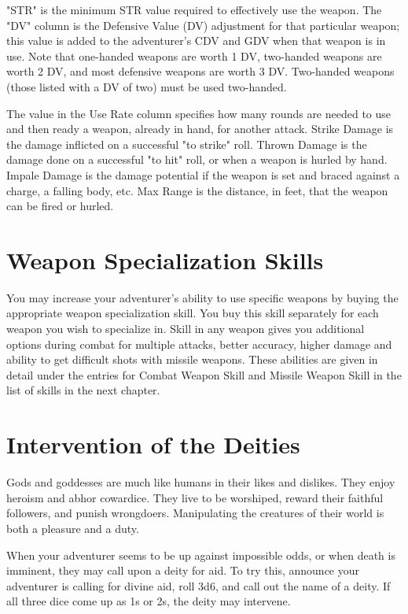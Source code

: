 "STR" is the minimum STR value required to effectively use the weapon. The "DV" column is the Defensive Value (DV) adjustment for that particular weapon; this value is added to the adventurer's CDV and GDV when that weapon is in use. Note that one-handed weapons are worth 1 DV, two-handed weapons are worth 2 DV, and most defensive weapons are worth 3 DV. Two-handed weapons (those listed with a DV of two) must be used two-handed.

The value in the Use Rate column specifies how many rounds are needed to use and then ready a weapon, already in hand, for another attack. Strike Damage is the damage inflicted on a successful "to strike" roll. Thrown Damage is the damage done on a successful "to hit" roll, or when a weapon is hurled by hand. Impale Damage is the damage potential if the weapon is set and braced against a charge, a falling body, etc. Max Range is the distance, in feet, that the weapon can be fired or hurled.
\label{playing-weapon-table}


\setlength{\columnsep}{\defcolwidth}
\section{Weapon Specialization Skills}
You may increase your adventurer's ability to use specific weapons by buying the appropriate weapon specialization skill. You buy this skill separately for each weapon you wish to specialize in. Skill in any weapon gives you additional options during combat for multiple attacks, better accuracy, higher damage and ability to get difficult shots with missile weapons. These abilities are given in detail under the entries for Combat Weapon Skill and Missile Weapon Skill in the list of skills in the next chapter.
\section{Intervention of the Deities}

Gods and goddesses are much like humans in their likes and dislikes. They enjoy heroism and abhor cowardice. They live to be worshiped, reward their faithful followers, and punish wrongdoers. Manipulating the creatures of their world is both a pleasure and a duty.

When your adventurer seems to be up against impossible odds, or when death is imminent, they may call upon a deity for aid. To try this, announce your adventurer is calling for divine aid, roll 3d6, and call out the name of a deity. If all three dice come up as 1s or 2s, the deity may intervene.

